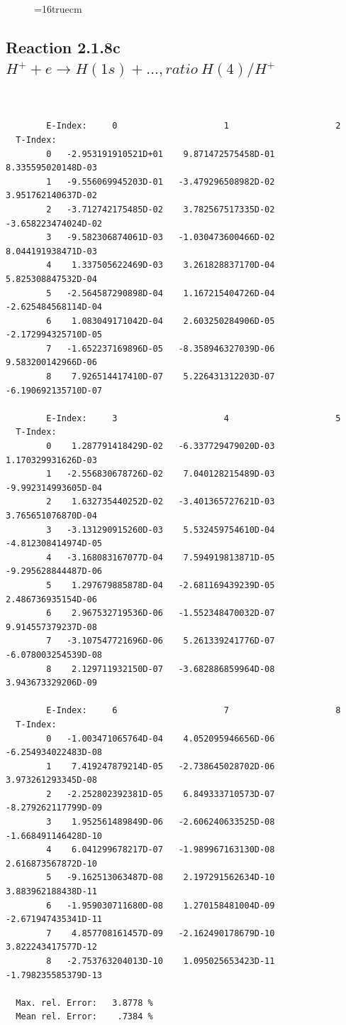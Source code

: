 \documentclass[12pt,dvips]{article}
\begin{document}
\begin{figure} \label{2.1.8rb}
\epsfxsize=16truecm
\end{figure}
\newpage



\subsection{
Reaction 2.1.8c  $H^+ + e \rightarrow H(1s) + ...,  ratio ~ H(4)/H^+$
}

\begin{small}\begin{verbatim}


        E-Index:     0                     1                     2
  T-Index:
        0   -2.953191910521D+01    9.871472575458D-01    8.335595020148D-03
        1   -9.556069945203D-01   -3.479296508982D-02    3.951762140637D-02
        2   -3.712742175485D-02    3.782567517335D-02   -3.658223474024D-02
        3   -9.582306874061D-03   -1.030473600466D-02    8.044191938471D-03
        4    1.337505622469D-03    3.261828837170D-04    5.825308847532D-04
        5   -2.564587290898D-04    1.167215404726D-04   -2.625484568114D-04
        6    1.083049171042D-04    2.603250284906D-05   -2.172994325710D-05
        7   -1.652237169896D-05   -8.358946327039D-06    9.583200142966D-06
        8    7.926514417410D-07    5.226431312203D-07   -6.190692135710D-07

        E-Index:     3                     4                     5
  T-Index:
        0    1.287791418429D-02   -6.337729479020D-03    1.170329931626D-03
        1   -2.556830678726D-02    7.040128215489D-03   -9.992314993605D-04
        2    1.632735440252D-02   -3.401365727621D-03    3.765651076870D-04
        3   -3.131290915260D-03    5.532459754610D-04   -4.812308414974D-05
        4   -3.168083167077D-04    7.594919813871D-05   -9.295628844487D-06
        5    1.297679885878D-04   -2.681169439239D-05    2.486736935154D-06
        6    2.967532719536D-06   -1.552348470032D-07    9.914557379237D-08
        7   -3.107547721696D-06    5.261339241776D-07   -6.078003254539D-08
        8    2.129711932150D-07   -3.682886859964D-08    3.943673329206D-09

        E-Index:     6                     7                     8
  T-Index:
        0   -1.003471065764D-04    4.052095946656D-06   -6.254934022483D-08
        1    7.419247879214D-05   -2.738645028702D-06    3.973261293345D-08
        2   -2.252802392381D-05    6.849333710573D-07   -8.279262117799D-09
        3    1.952561489849D-06   -2.606240633525D-08   -1.668491146428D-10
        4    6.041299678217D-07   -1.989967163130D-08    2.616873567872D-10
        5   -9.162513063487D-08    2.197291562634D-10    3.883962188438D-11
        6   -1.959030711680D-08    1.270158481004D-09   -2.671947435341D-11
        7    4.857708161457D-09   -2.162490178679D-10    3.822243417577D-12
        8   -2.753763204013D-10    1.095025653423D-11   -1.798235585379D-13

  Max. rel. Error:   3.8778 %
  Mean rel. Error:    .7384 %


\end{verbatim}\end{small}
\end{document}
